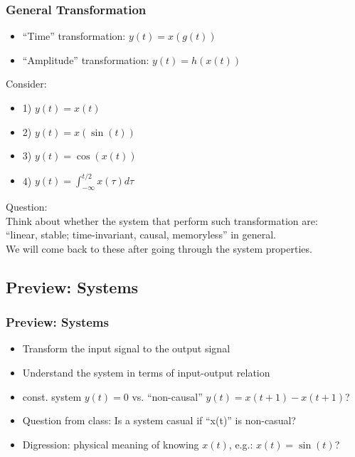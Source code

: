 \documentclass{beamer}
\begin{document}
\begin{frame}
    \frametitle{General Transformation}
    \begin{itemize}
    \item ``Time'' transformation: $ y(t) = x(g(t)) $ \\
    \item ``Amplitude'' transformation: $ y(t) = h(x(t)) $ \\
    \end{itemize}
Consider:
    \begin{itemize}
    \item 1) $y(t) = x(t) $
    \item  2) $y(t) = x(\sin(t))$   
    \item  3) $y(t) = \cos(x(t))$ 
    \item 4) $y(t)=\int_{-\infty}^{t/2}x(\tau)d\tau$               
    \end{itemize}
Question: \\
    \quad Think about whether the system that perform such transformation are: \\
    \quad ``linear, stable; time-invariant, causal, memoryless'' in general.  \\
We will come back to these after going through the system properties.
\end{frame}


\subsection{Preview: Systems}

\begin{frame}
    \frametitle{Preview: Systems}
\begin{itemize}
    \item Transform the input signal to the output signal
    \item Understand the system in terms of input-output relation
    \item const. system $y(t) = 0$ vs. ``non-causal'' $ y(t) = x(t+1) - x(t+1)$?
    \bigskip
    \bigskip
    \item Question from class: Is a system casual if ``x(t)'' is non-casual?
    \bigskip
    \bigskip
    \bigskip
    \item Digression: physical meaning of knowing $x(t)$, e.g.: $x(t) = \sin(t)$?
\end{itemize}

\end{frame}

\end{document}
